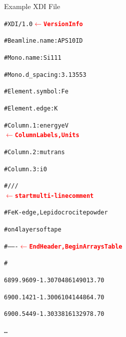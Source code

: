 \documentclass[final]{beamer}
\newcommand{\Color}[2]{{\textcolor{#1}{#2}}}
\newcommand{\BoldRed}[1]{{\Color{Red}{\bf{#1}}}}
\begin{document}
\begin{frame}{}
\begin{columns}[t]
      \begin{column}{.42\linewidth}
        \begin{block}{Example XDI File}
          \begin{center}
            \begin{minipage}[t]{0.95\linewidth}
              \begin{alltt}
                {\footnotesize
                  \#XDI/1.0  {\BoldRed{$\leftarrow$ Version Info}}\par
                  \#Beamline.name: APS 10ID\par
                  \#Mono.name:  Si 111\par
                  \#Mono.d\_spacing: 3.13553\par
                  \#Element.symbol: Fe\par
                  \#Element.edge: K\par
                  \#Column.1: energy eV    
                  {\BoldRed{$\leftarrow$ Column Labels, Units}}\par
                  \#Column.2: mutrans\par
                  \#Column.3: i0\par
                  \#///
                  {\BoldRed{$\leftarrow$ start multi-line comment}}\par
                  \#Fe K-edge, Lepidocrocite powder\par
                  \#on 4 layers of tape\par
                  \#------- {\BoldRed{$\leftarrow$ End Header, Begin Arrays Table}}\par
                  \#\par
                  \hspace{3mm} 6899.9609 -1.3070486 149013.70\par
                  \hspace{3mm} 6900.1421 -1.3006104 144864.70\par
                  \hspace{3mm} 6900.5449 -1.3033816 132978.70\par
                  \hspace{3mm} \ldots\par
                }
              \end{alltt}
            \end{minipage}
          \end{center}
        \end{block}


\end{column}
\end{columns}
\end{frame}
\end{document}
